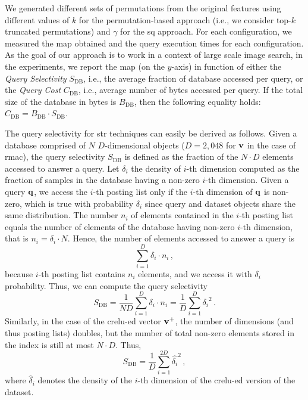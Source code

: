 We generated different sets of permutations from the original features using different values of $k$ for the permutation-based approach (i.e., we consider top-$k$ truncated permutations) and $\gamma$ for the \gls{sq} approach.
For each configuration, we measured the \acrfull{map} obtained and the query execution times for each configuration.
As the goal of our approach is to work in a context of large scale image search, in the experiments, we report the \gls{map} (on the $y$-axis) in function of either the \emph{Query Selectivity} $S_\text{DB}$, i.e., the average fraction of database accessed per query, or the \emph{Query Cost} $C_\text{DB}$, i.e., average number of bytes accessed per query.
If the total size of the database in bytes is $B_\text{DB}$, then the following equality holds: $C_\text{DB} = B_\text{DB} \cdot S_\text{DB}$.


The query selectivity for \gls{str} techniques can easily be derived as follows.
Given a database comprised of $N$ $D$-dimensional objects ($D=2,048$ for $\mathbf{v}$ in the case of \gls{rmac}), the query selectivity $S_\text{DB}$ is defined as the fraction of the $N \cdot D$ elements accessed to answer a query.
Let $\delta_i$ the density of $i$-th dimension computed as the fraction of samples in the database having a non-zero $i$-th dimension.
Given a query $\mathbf{q}$, we access the $i$-th posting list only if the $i$-th dimension of $ \mathbf{q}$ is non-zero, which is true with probability $\delta_i$ since query and dataset objects share the same distribution.
The number $n_i$ of elements contained in the $i$-th posting list equals the number of elements of the database having non-zero $i$-th dimension, that is $n_i = \delta_i \cdot N$.
Hence, the number of elements accessed to answer a query is
\begin{equation}
\sum_{i=1}^D \delta_i \cdot n_i \,,
\end{equation}
because $i$-th posting list contains $n_i$ elements, and we access it with $\delta_i$ probability.
Thus, we can compute the query selectivity
\begin{equation}
S_\text{DB} = \frac{1}{ND} \sum_{i=1}^D \delta_i \cdot n_i = \frac{1}{D} \sum_{i=1}^D {\delta_i}^2\,.
\end{equation}
Similarly, in the case of the \gls{crelu}-ed vector $\mathbf{v}^+$, the number of dimensions (and thus posting lists) doubles, but the number of total non-zero elements stored in the index is still at most $N \cdot D$.
Thus,
\begin{equation}
S_\text{DB} = \frac{1}{D} \sum_{i=1}^{2D} \hat{\delta_i}^2 \,,
\end{equation}
where $\hat{\delta}_i$ denotes the density of the $i$-th dimension of the \gls{crelu}-ed version of the dataset.


